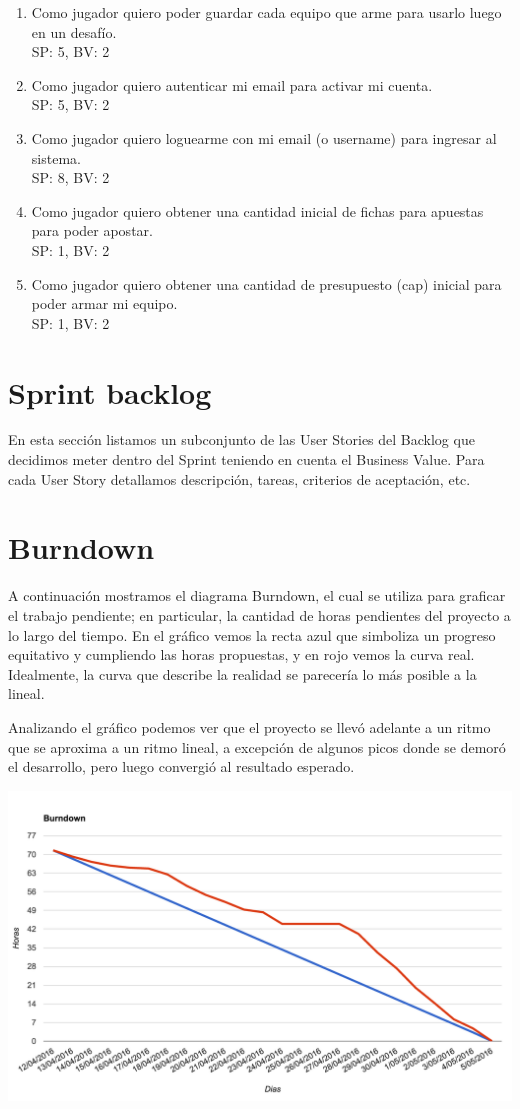\documentclass[a4paper, 10pt, twoside]{article}
\begin{document}
\begin{enumerate}
    \item  Como jugador quiero poder guardar cada equipo que arme para usarlo luego en un desaf\'io.
    \\SP: 5, BV: 2
    \item Como jugador quiero autenticar mi email para activar mi cuenta.
    \\SP: 5, BV: 2
    \item Como jugador quiero loguearme con mi email (o username) para ingresar al sistema.
    \\SP: 8, BV: 2
    \item  Como jugador quiero obtener una cantidad inicial de fichas para apuestas para poder apostar.
    \\SP: 1, BV: 2
    \item Como jugador quiero obtener una cantidad de presupuesto (cap) inicial para poder armar mi equipo.
    \\SP: 1, BV: 2
    
\end{enumerate}
 
\section{Sprint backlog}
En esta secci\'on listamos un subconjunto de las User Stories del Backlog que decidimos meter dentro del Sprint teniendo en cuenta el Business Value. Para cada User Story detallamos descripci\'on, tareas, criterios de aceptaci\'on, etc.





\section{Burndown}

A continuaci\'on mostramos el diagrama Burndown, el cual se utiliza para graficar el trabajo pendiente; en particular, la cantidad de horas pendientes del proyecto a lo largo del tiempo.
En el gr\'afico vemos la recta azul que simboliza un progreso equitativo y cumpliendo las horas propuestas, y en rojo vemos la curva real. Idealmente, la curva que describe la realidad se parecer\'ia lo m\'as posible a la lineal.

Analizando el gr\'afico podemos ver que el proyecto se llev\'o adelante a un ritmo que se aproxima a un ritmo lineal, a excepci\'on de algunos picos donde se demor\'o el desarrollo, pero luego convergió al resultado esperado.

  \begin{center}
	\includegraphics[width=15cm]{diagramas/burn}
  \end{center}

\end{document}
